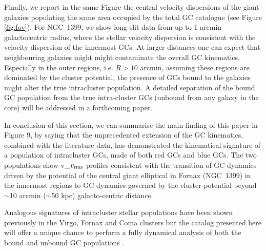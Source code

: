 \documentclass[useAMS,usenatbib]{mn2e}
\begin{document}
Finally, we report in the same Figure the central velocity dispersions of 
the giant galaxies populating the same area occupied by the total GC catalogue (see Figure \ref{fig:fov}). 
For NGC~1399, we show long slit data from \citet{Saglia00} up 
to 1 arcmin galactocentric radius, where the stellar velocity dispersion is consistent with
the velocity dispersion of the innermost GCs.
At larger distances one can expect that neighbouring galaxies might
might contaminate the overall GC kinematics. Especially in the outer regions, 
i.e. $R>10$ arcmin, assuming these regions are dominated by the cluster 
potential, the presence of GCs bound to the galaxies might alter the true  
intracluster population. A detailed separation of the bound GC population from 
the true intra-cluster GCs (unbound from any galaxy in the core) will be addressed in a 
forthcoming paper. 

In conclusion of this section, we can summarise the main finding of this paper 
in Figure 9, by saying that the unprecedented extension of the GC kinematics, 
combined with the literature data, has demonstrated the kinematical signature 
of a population of intracluster GCs, made of both red GCs and blue GCs. 
The two populations show v_$v_{\rm rms}$ profiles consistent with the transition of GC 
dynamics driven by the potential of the central giant elliptical in Fornax (NGC~1399) 
in the innermost regions to GC dynamics governed by the cluster potential 
beyond $\sim$10 arcmin ($\sim$50 kpc) galacto-centric distance.

Analogous signatures of intracluster stellar populations have been shown 
previously in the Virgo, Fornax and Coma clusters \citep[see e.g., ][]{Paolillo02, Arnaboldi04, Peng11,
Longobardi15} but the catalog presented here will offer a unique 
chance to perform a fully dynamical analysis of both the bound and unbound GC 
populations \citep{DAbrusco16}.
\end{document}
